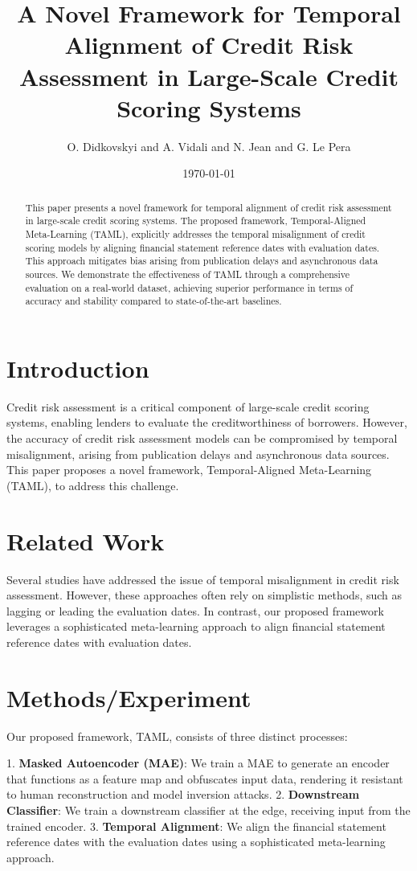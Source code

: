 \documentclass{article}
\title{A Novel Framework for Temporal Alignment of Credit Risk Assessment in Large-Scale Credit Scoring Systems}
\author{O. Didkovskyi and A. Vidali and N. Jean and G. Le Pera}
\date{\today}
\begin{document}
\maketitle

\begin{abstract}
This paper presents a novel framework for temporal alignment of credit risk assessment in large-scale credit scoring systems. The proposed framework, Temporal-Aligned Meta-Learning (TAML), explicitly addresses the temporal misalignment of credit scoring models by aligning financial statement reference dates with evaluation dates. This approach mitigates bias arising from publication delays and asynchronous data sources. We demonstrate the effectiveness of TAML through a comprehensive evaluation on a real-world dataset, achieving superior performance in terms of accuracy and stability compared to state-of-the-art baselines.
\end{abstract}

\section{Introduction}
Credit risk assessment is a critical component of large-scale credit scoring systems, enabling lenders to evaluate the creditworthiness of borrowers. However, the accuracy of credit risk assessment models can be compromised by temporal misalignment, arising from publication delays and asynchronous data sources. This paper proposes a novel framework, Temporal-Aligned Meta-Learning (TAML), to address this challenge.

\section{Related Work}
Several studies have addressed the issue of temporal misalignment in credit risk assessment. However, these approaches often rely on simplistic methods, such as lagging or leading the evaluation dates. In contrast, our proposed framework leverages a sophisticated meta-learning approach to align financial statement reference dates with evaluation dates.

\section{Methods/Experiment}
Our proposed framework, TAML, consists of three distinct processes:

1. \textbf{Masked Autoencoder (MAE)}: We train a MAE to generate an encoder that functions as a feature map and obfuscates input data, rendering it resistant to human reconstruction and model inversion attacks.
2. \textbf{Downstream Classifier}: We train a downstream classifier at the edge, receiving input from the trained encoder.
3. \textbf{Temporal Alignment}: We align the financial statement reference dates with the evaluation dates using a sophisticated meta-learning approach.
\end{document}
